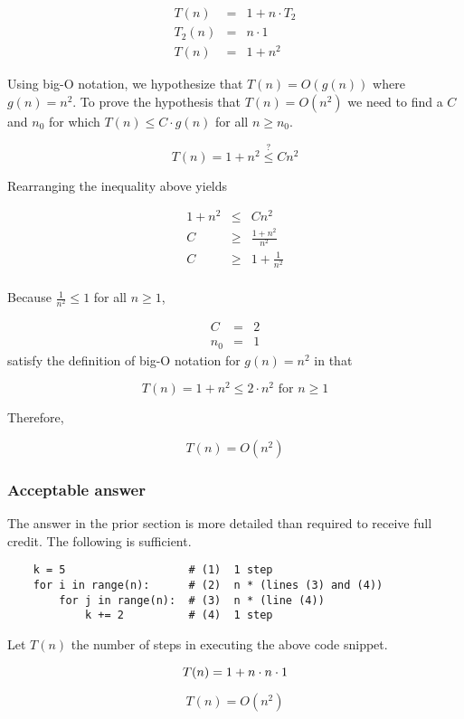 \documentclass{article}
\begin{document}
\begin{eqnarray*}
  T(n) &=& 1 + n \cdot T_2 \\
  T_2(n) &=& n \cdot 1 \\
  T(n) &=& 1 + n^2
\end{eqnarray*}

Using big-O notation, we hypothesize that $T(n) = O(g(n))$ where $g(n) = n^2$.
To prove the hypothesis that $T(n) = O(n^2)$ we need to find a $C$ and $n_0$ for
which $T(n) \leq C \cdot g(n)$ for all $n \geq n_0$.

\[
T(n) = 1 + n^2 \stackrel{?}{\leq} C n^2
\]

Rearranging the inequality above yields

\begin{eqnarray*}
  1 + n^2 &\leq& C n^2 \\
  C &\geq& \frac{1 + n^2}{n^2} \\
  C &\geq& 1 + \frac{1}{n^2} \\
\end{eqnarray*}

Because $\frac{1}{n^2} \leq 1$ for all $n \geq 1$,

\begin{eqnarray*}
  C &=& 2 \\
  n_0 &=& 1
\end{eqnarray*}
satisfy the definition of big-O notation for $g(n) = n^2$ in that

\[
T(n) = 1 + n^2 \leq 2 \cdot n^2 \text{ for } n \geq 1
\]

Therefore,

\[
\boxed{T(n) = O(n^2)}
\]

\subsubsection{Acceptable answer}

The answer in the prior section is more detailed than required to receive
full credit.  The following is sufficient.

\begin{graybox}
  \begin{verbatim}
    k = 5                   # (1)  1 step     
    for i in range(n):      # (2)  n * (lines (3) and (4))
        for j in range(n):  # (3)  n * (line (4))
            k += 2          # (4)  1 step
  \end{verbatim}

  Let $T(n)$ the number of steps in executing the above code snippet.

  \[
    T(n) = 1 + n \cdot n \cdot 1 \\
  \]

  \[
    \boxed{T(n) = O(n^2)}
  \]
  
\end{graybox}
\end{document}
